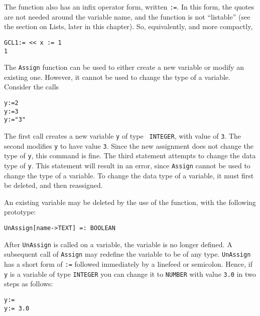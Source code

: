 \noindent 
The  function also has an infix operator form, written
{\tt :=}.  In this form, the quotes are not needed around the variable
name, and the function is not ``listable'' (see the section on Lists,
later in this chapter).  So, equivalently, and more compactly,

\begin{verbatim}
GCL1:= << x := 1
1
\end{verbatim}

The {\tt Assign} function can be used to either create a new variable or
modify an existing one.  However, it cannot be used to change the type
of a variable.  Consider the calls

\begin{verbatim}
y:=2
y:=3
y:="3"
\end{verbatim}
\noindent The first call creates a new variable {\tt y} of type {\tt
INTEGER}, with value of \verb+3+.  The second modifies \verb+y+ to
have value \verb+3+.  Since the new assignment does not change the
type of \verb+y+, this command is fine.  The third statement attempts
to change the data type of \verb+y+.  This statement will result in an
error, since {\tt Assign} cannot be used to change the type of a
variable.  To change the data type of a variable, it must first be
deleted, and then reassigned.  

An existing variable may be deleted by the use of the 
function, with the following prototype:

\begin{verbatim}
UnAssign[name->TEXT] =: BOOLEAN
\end{verbatim}

\noindent After \verb+UnAssign+ is called on a variable, the variable
is no longer defined.  A subsequent call of {\tt Assign} may redefine
the variable to be of any type.  \verb+UnAssign+ has a short form of
\verb+:=+ followed immediately by a linefeed or semicolon.  Hence, if
\verb+y+ is a variable of type \verb+INTEGER+ you can change it to
\verb+NUMBER+ with value \verb+3.0+ in two steps as follows:

\begin{verbatim}
y:=
y:= 3.0
\end{verbatim}  

\subsection{}

